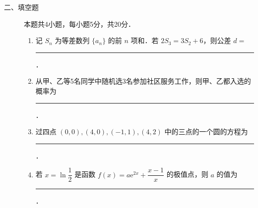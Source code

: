 \begin{description}
    \item[二、填空题] 本题共4小题，每小题5分，共20分．
    \begin{enumerate}[leftmargin=5pt]
      \addtocounter{enumi}{+12}
        \item 记 $S_n$ 为等差数列 $\{a_n\}$ 的前 $n$ 项和．若 $2S_3=3S_2+6$，则公差 $d=$ \rule[-0.3ex]{3em}{0.4pt}．
        \item 从甲、乙等5名同学中随机选3名参加社区服务工作，则甲、乙都入选的概率为 \rule[-0.3ex]{3em}{0.4pt}．
        \item 过四点 $(0,0),(4,0),(-1,1),(4,2)$ 中的三点的一个圆的方程为 \rule[-0.3ex]{3em}{0.4pt}．
        \item 若 $x=\ln\dfrac{1}{2}$ 是函数 $f(x)=a\mathrm{e}^{2x}+\dfrac{x-1}{x}$ 的极值点，则 $a$ 的值为 \rule[-0.3ex]{3em}{0.4pt}．
    \end{enumerate}
\end{description}

